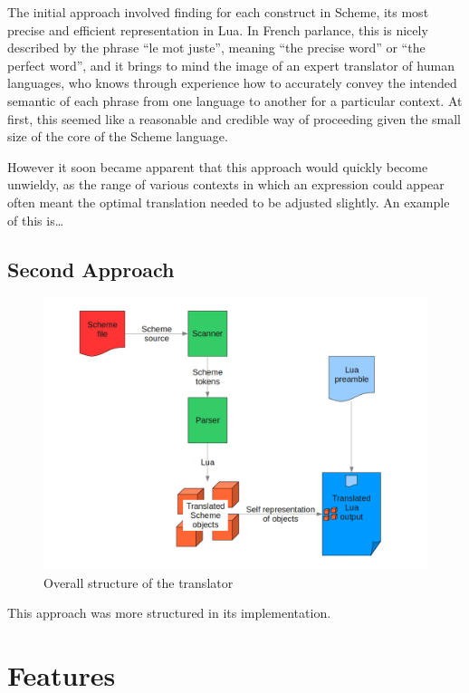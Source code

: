 The initial approach involved finding for each construct in Scheme, its most
precise and efficient representation in Lua. In French parlance, this is nicely
described by the phrase ``le mot juste'', meaning ``the precise word'' or ``the
perfect word'', and it brings to mind the image of an expert translator of
human languages, who knows through experience how to accurately convey the
intended semantic of each phrase from one language to another for a particular
context.  At first, this seemed like a reasonable and credible way of
proceeding given the small size of the core of the Scheme language.

However it soon became apparent that this approach would quickly become
unwieldy, as the range of various contexts in which an expression could appear
often meant the optimal translation needed to be adjusted slightly. An example
of this is\ldots

\subsection{Second Approach}

\begin{figure}
\centering
\includegraphics[width=\textwidth]{overview.png}
\caption{Overall structure of the translator}
\label{fig:overview}
\end{figure}

This approach was more structured in its implementation.


\section{Features}

